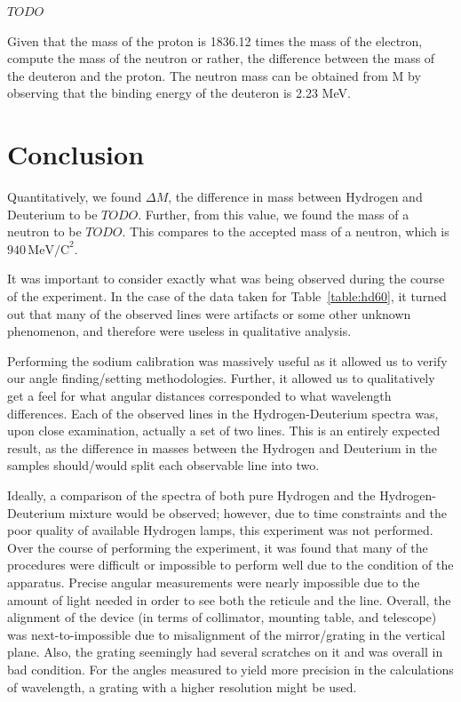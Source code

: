 \documentclass[paper=a4, fontsize=11pt]{scrartcl} %
\numberwithin{equation}{section}
\numberwithin{figure}{section}
\numberwithin{table}{section}
\begin{document}
$TODO$

Given that the mass of the proton is 1836.12 times the mass of the electron, compute the mass of the
neutron or rather, the difference between the mass of the deuteron and the proton. The neutron mass
can be obtained from M by observing that the binding energy of the deuteron is 2.23 MeV.


\section{Conclusion}

Quantitatively, we found $\Delta M$, the difference in mass between Hydrogen and Deuterium to be $TODO$. Further, from this value, we found the mass of a neutron to be $TODO$. This compares to the accepted mass of a neutron, which is $940 \, \mathrm{MeV/C}^2$.


It was important to consider exactly what was being observed during the course of the experiment. In the case of the data taken for Table~\ref{table:hd60}, it turned out that many of the observed lines were artifacts or some other unknown phenomenon, and therefore were useless in qualitative analysis.

Performing the sodium calibration was massively useful as it allowed us to verify our angle finding/setting methodologies. Further, it allowed us to qualitatively get a feel for what angular distances corresponded to what wavelength differences. Each of the observed lines in the Hydrogen-Deuterium spectra was, upon close examination, actually a set of two lines. This is an entirely expected result, as the difference in masses between the Hydrogen and Deuterium in the samples should/would split each observable line into two.

Ideally, a comparison of the spectra of both pure Hydrogen and the Hydrogen-Deuterium mixture would be observed; however, due to time constraints and the poor quality of available Hydrogen lamps, this experiment was not performed. \\


Over the course of performing the experiment, it was found that many of the procedures were difficult or impossible to perform well due to the condition of the apparatus. Precise angular measurements were nearly impossible due to the amount of light needed in order to see both the reticule and the line. Overall, the alignment of the device (in terms of collimator, mounting table, and telescope) was next-to-impossible due to misalignment of the mirror/grating in the vertical plane. Also, the grating seemingly had several scratches on it and was overall in bad condition. For the angles measured to yield more precision in the calculations of wavelength, a grating with a higher resolution might be used.
\end{document}
